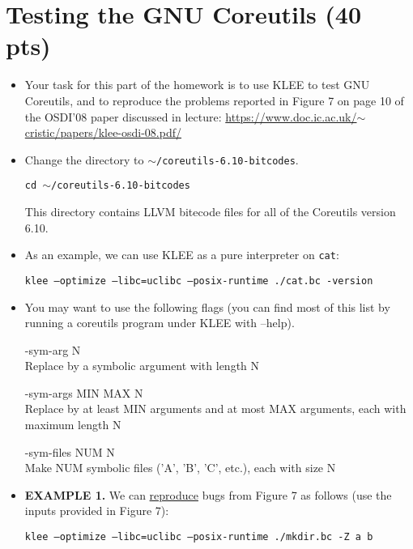 \documentclass[12pt,letterpaper]{article}
\begin{document}
 
\newpage


\section{Testing the GNU Coreutils (40 pts)}


\begin{itemize}

\item Your task for this part of the homework is to use KLEE to test
  GNU Coreutils, and to reproduce the problems reported in Figure 7 on
  page 10 of the OSDI'08 paper discussed in lecture:
  \href{https://www.doc.ic.ac.uk/~cristic/papers/klee-osdi-08.pdf}{https://www.doc.ic.ac.uk/$\sim$cristic/papers/klee-osdi-08.pdf/}
  
\item Change the directory to \texttt{$\sim$/coreutils-6.10-bitcodes}.

\texttt{cd $\sim$/coreutils-6.10-bitcodes}

This directory contains LLVM bitecode files for all of the
Coreutils version 6.10.

\item As an example, we can use KLEE as a pure interpreter on
  \texttt{cat}:

\texttt{klee --optimize --libc=uclibc --posix-runtime ./cat.bc -version}


\item You may want to use the following flags (you can find most of
  this list by running a coreutils program under KLEE with --help).

-sym-arg N\\
Replace by a symbolic argument with length N

-sym-args MIN MAX N\\
Replace by at least MIN arguments and at most MAX arguments, each with maximum length N

-sym-files NUM N\\
Make NUM symbolic files ('A', 'B', 'C', etc.), each with size N


\item \textbf{EXAMPLE 1. } We can \underline{reproduce} bugs from
  Figure 7 as follows (use the inputs provided in Figure 7):

\texttt{klee --optimize --libc=uclibc --posix-runtime ./mkdir.bc -Z a b}


\end{itemize}
\end{document}
